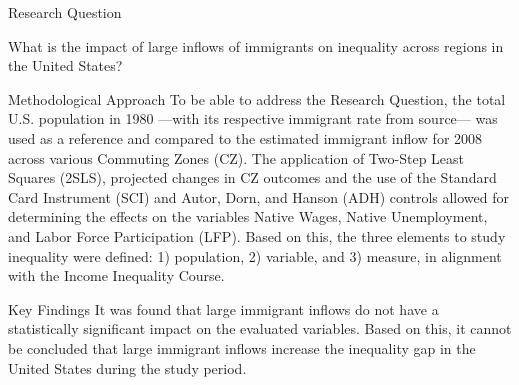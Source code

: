 \begin{frame}

    \begin{block}{Research Question}
    \end{block}
    What is the impact of large inflows of immigrants on inequality across regions in the United States?
    \begin{block}{Methodological Approach} 
    To be able to address the Research Question, the total U.S. population in 1980 —with its respective immigrant rate from source— was used as a reference and compared to the estimated immigrant inflow for 2008 across various Commuting Zones (CZ).
    The application of Two-Step Least Squares (2SLS), projected changes in CZ outcomes and the use of the Standard Card Instrument (SCI) and Autor, Dorn, and Hanson (ADH) controls allowed for determining the effects on the variables Native Wages, Native Unemployment, and Labor Force Participation (LFP).
    Based on this, the three elements to study inequality were defined: 1) population, 2) variable, and 3) measure, in alignment with the Income Inequality Course.        
    \end{block}
    \begin{block}{Key Findings} 
    It was found that large immigrant inflows do not have a statistically significant impact on the evaluated variables. Based on this, it cannot be concluded that large immigrant inflows increase the inequality gap in the United States during the study period.
    \end{block}
    
\end{frame}
